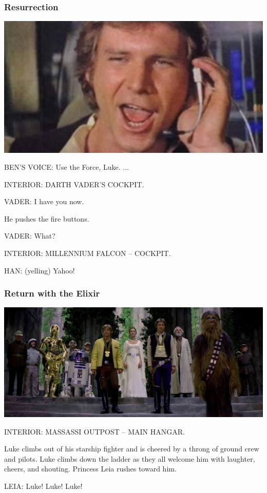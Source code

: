 \documentclass{beamer}
\begin{document}
\begin{frame}\frametitle{Resurrection}

\includegraphics[scale=0.5]{yahoo.jpg}

BEN'S VOICE: Use the Force, Luke.  ...

INTERIOR: DARTH VADER'S COCKPIT.

VADER: I have you now.

           He pushes the fire buttons.

VADER: What?

INTERIOR: MILLENNIUM FALCON -- COCKPIT.

HAN: (yelling) Yahoo!
\end{frame}
\begin{frame}\frametitle{Return with the Elixir}

\includegraphics[width=\textwidth]{finalscene.jpg}

INTERIOR: MASSASSI OUTPOST -- MAIN HANGAR.

Luke climbs out of his starship fighter and is cheered by a
throng of ground crew and pilots. Luke climbs down the ladder
as they all welcome him with laughter, cheers, and shouting.
Princess Leia rushes toward him.


LEIA: Luke! Luke! Luke!




\end{frame}
\end{document}
